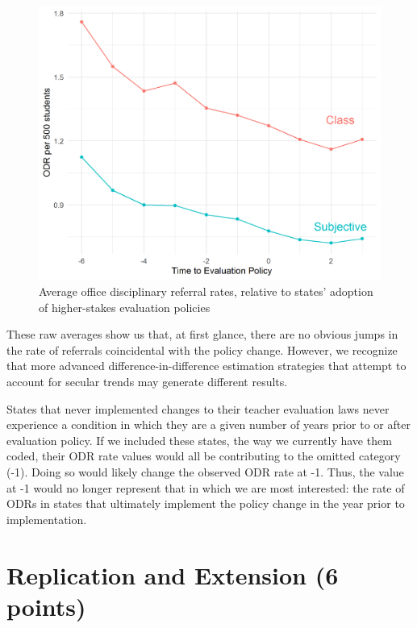 \documentclass[a4paper, 11pt]{article}
\begin{document}
\begin{enumerate}
	\begin{figure} [!htbp]
		\begin{center}
			\includegraphics[scale=0.8]{figures/averages.png}
			\caption{Average office disciplinary referral rates, relative to states' adoption of higher-stakes evaluation policies}
			 \label{fig:means}
		\end{center}
	\end{figure}

These raw averages show us that, at first glance, there are no obvious jumps in the rate of referrals coincidental with the policy change. However, we recognize that more advanced difference-in-difference estimation strategies that attempt to account for secular trends may generate different results. 

States that never implemented changes to their teacher evaluation laws never experience a condition in which they are a given number of years prior to or after evaluation policy. If we included these states, the way we currently have them coded, their ODR rate values would all be contributing to the omitted category (-1). Doing so would likely change the observed ODR rate at -1. Thus, the value at -1 would no longer represent that in which we are most interested: the rate of ODRs in states that ultimately implement the policy change in the year prior to implementation. 

\end{enumerate}


\section{Replication and Extension (6 points)}
\end{document}
